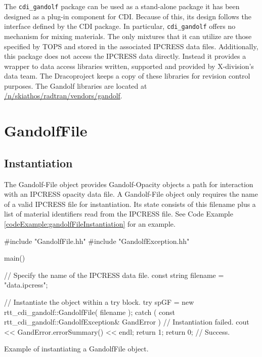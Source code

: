 \documentclass[11pt]{nmemo}
\newcommand{\draco}{{\normalfont\sffamily Draco}}
\newenvironment{codeExample}
{\footnotesize 
  \VerbatimEnvironment
  \begin{SaveVerbatim}{\mycode}}%
  {\end{SaveVerbatim}%
  \noindent%
  \parashade[.950]{sharpcorners}{\gdef\outlineboxwidth{.5}%
    \UseVerbatim{\mycode}}\normalsize}
\begin{document}
The \texttt{cdi\_gandolf} package can be used as a stand-alone package
it has been designed as a plug-in component for CDI.  Because of this,
its design follows the interface defined by the CDI package.  In
particular, \texttt{cdi\_gandolf} offers no mechanism for mixing
materials.  The only mixtures that it can utilize are those specified
by TOPS and stored in the associated IPCRESS data files.
Additionally, this package does not access the IPCRESS data directly.
Instead it provides a wrapper to data access libraries written,
supported and provided by X-division's data team.  The \draco project
keeps a copy of these libraries for revision control purposes.  The
Gandolf libraries are located at
\url{/n/skiathos/radtran/vendors/gandolf}.


\section{GandolfFile}
\label{gandolffile}
\subsection{Instantiation}

The Gandolf-File object provides Gandolf-Opacity objects a path for
interaction with an IPCRESS opacity data file.  A Gandolf-File object
only requires the name of a valid IPCRESS file for instantiation.  Its
state consists of this filename plus a list of material identifiers
read from the IPCRESS file.  See Code Example
\ref{codeExample:gandolfFileInstantiation} for an example.

\begin{cxxSampleCode}
\begin{codeExample}
#include "GandolfFile.hh"
#include "GandolfException.hh"

main()
{
   // Specify the name of the IPCRESS data file.
   const string filename = "data.ipcress";

   // Instantiate the object within a try block.
   try
      {
         spGF = new rtt_cdi_gandolf::GandolfFile( filename );
      }
   catch ( const rtt_cdi_gandolf::GandolfException& GandError )
      {
         // Instantiation failed.
         cout << GandError.errorSummary() << endl;
         return 1;
      }
   return 0;  // Success.
}
\end{codeExample}
\caption{Example of instantiating a GandolfFile object.}
\label{codeExample:gandolfFileInstantiation}
\end{cxxSampleCode}
\end{document}
